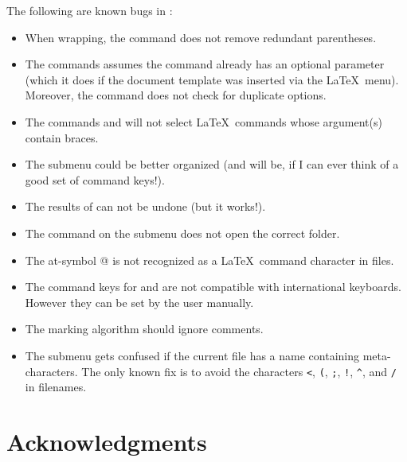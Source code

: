 \documentclass{report}
\begin{document}
The following are known bugs in :
\begin{itemize}
	\item When wrapping, the  command does not remove redundant 
	parentheses.

	\item The  commands assumes the  
	command already has an optional parameter (which it does if the 
	document template was inserted via the \LaTeX\ menu).  Moreover, the 
	 command does not check for duplicate options.

	\item The commands  and 
	 will not select \LaTeX\ commands 
	whose argument(s) contain braces.

	\item  The  submenu could be better organized (and will 
	be, if I can ever think of a good set of command keys!).

	\item The results of  can not be undone (but it 
	works!).
	
	\item  The  command on the  
	submenu does not open the correct folder.
	
	\item  The at-symbol @ is not recognized as a \LaTeX\ command 
	character in  files.
	
	\item The command keys for  and  
	are not compatible with international keyboards.  However they can be
	set by the user manually.
	
	\item  The marking algorithm should ignore comments.
	
	\item The  submenu gets confused if the current file 
	has a name containing meta-characters.  The only known fix is to 
	avoid the characters \verb|<|, \verb|(|, \verb|;|, \verb|!|, 
	\verb|^|, and \verb|/| in filenames.
\end{itemize}


\section{Acknowledgments}
\end{document}
